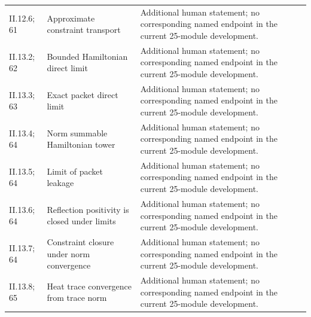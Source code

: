 \begin{longtable}{@{}p{.13\linewidth}p{.34\linewidth}p{.46\linewidth}@{}}
II.12.6; 61 & Approximate constraint transport & Additional human statement; no corresponding named endpoint in the current 25-module development.\\
II.13.2; 62 & Bounded Hamiltonian direct limit & Additional human statement; no corresponding named endpoint in the current 25-module development.\\
II.13.3; 63 & Exact packet direct limit & Additional human statement; no corresponding named endpoint in the current 25-module development.\\
II.13.4; 64 & Norm summable Hamiltonian tower & Additional human statement; no corresponding named endpoint in the current 25-module development.\\
II.13.5; 64 & Limit of packet leakage & Additional human statement; no corresponding named endpoint in the current 25-module development.\\
II.13.6; 64 & Reflection positivity is closed under limits & Additional human statement; no corresponding named endpoint in the current 25-module development.\\
II.13.7; 64 & Constraint closure under norm convergence & Additional human statement; no corresponding named endpoint in the current 25-module development.\\
II.13.8; 65 & Heat trace convergence from trace norm & Additional human statement; no corresponding named endpoint in the current 25-module development.\\
\bottomrule\end{longtable}
